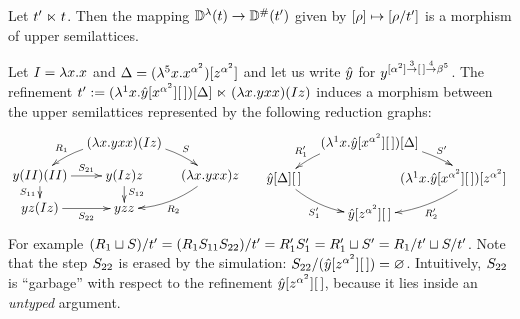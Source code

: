 \begin{corollary}
Let $t' \mathrel{\ltimes} t$.
Then the mapping $\mathbb{D}^{\lambda}(t) \to \mathbb{D}^{\mathtt{\#}}(t')$
given by ${[\rho]} \mapsto {[\rho/t']}$ is a morphism of upper
semilattices.
\end{corollary}

\begin{example}
Let $I = \lambda x. x$
and $\Delta = (\lambda^{5} x. x^{\alpha^2})[z^{\alpha^2}]$
and let us write $\hat{y}$ for $y^{[\alpha^2] \overset{3}{\to} [\,] \overset{4}{\to} \beta^5}$.
The refinement $t' := (\lambda^{1} x. \hat{y}[x^{\alpha^2}][\,])[\Delta] \mathrel{\ltimes} (\lambda x. yxx)(Iz)$
induces a morphism between the upper semilattices represented by the following reduction graphs:
\[
  \xymatrix@R=.3cm@C=.3cm{
  &
    (\lam{\var}{\vartwo\var\var})(I\varthree)
    \ar@/_.25cm/[dl]_-{\redex_1}
    \ar@/^.25cm/[dr]^-{\redextwo}
  &
  &
  \\
    \vartwo(II)(II)
    \ar[d]_-{\redextwo_{11}}
    \ar[r]^-{\redextwo_{21}}
  &
    \vartwo(I\varthree)\varthree
    \ar[d]^{\redextwo_{12}}
  &
    (\lam{\var}{\vartwo\var\var})\varthree
    \ar@/^.25cm/[dl]^-{\redex_2}
  \\
    \vartwo \varthree (I\varthree)
    \ar[r]_-{\redextwo_{22}}
  &
    \vartwo \varthree \varthree
  }
  \xymatrix@R=.3cm@C=.3cm{
  &
    (\lamp{1}{\var}{\hat{\vartwo}[\var^{\alpha^2}][\,]})[\Delta]
    \ar@/_.25cm/[dl]_-{\redex'_1}
    \ar@/^.25cm/[dr]^-{\redextwo'}
  \\
    \hat{\vartwo}[\Delta][\,]
    \ar@/_.25cm/[dr]_-{\redextwo'_1}
  &
  &
    \hspace{-1cm}(\lamp{1}{\var}{\hat{\vartwo}[\var^{\alpha^2}][\,]})[\varthree^{\alpha^2}]
    \ar@/^.25cm/[dl]^-{\redex'_2}
  \\
  &
    \hat{\vartwo}[\varthree^{\alpha^2}][\,]
  }
\]
For example
$(R_1 \sqcup S)/t' = (R_1S_{11}S_{22})/t' = R'_1S'_1 = R'_1 \sqcup S' = R_1/t' \sqcup S/t'$.
Note that the step $S_{22}$ is erased by the simulation: $S_{22}/(\hat{y}[z^{\alpha^2}][\,]) = \varnothing$.
Intuitively, $S_{22}$ is ``garbage'' with respect to the refinement $\hat{y}[z^{\alpha^2}][\,]$,
because it lies inside an {\em untyped} argument.
\end{example}
